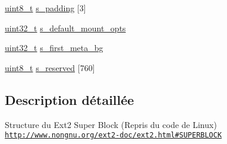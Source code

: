 \begin{DoxyCompactItemize}
\item 
\hyperlink{kernel_2include_2types_8h_aba7bc1797add20fe3efdf37ced1182c5}{uint8\-\_\-t} \hyperlink{structext2__super__block_a81b4e1959f344b5b7445044806d27807}{s\-\_\-padding} \mbox{[}3\mbox{]}
\item 
\hyperlink{kernel_2include_2types_8h_a33594304e786b158f3fb30289278f5af}{uint32\-\_\-t} \hyperlink{structext2__super__block_a8f4946dffa8c6a9027ee9329fd3f94c9}{s\-\_\-default\-\_\-mount\-\_\-opts}
\item 
\hyperlink{kernel_2include_2types_8h_a33594304e786b158f3fb30289278f5af}{uint32\-\_\-t} \hyperlink{structext2__super__block_a436c7c8af548ade7f8045e88c2861d61}{s\-\_\-first\-\_\-meta\-\_\-bg}
\item 
\hyperlink{kernel_2include_2types_8h_aba7bc1797add20fe3efdf37ced1182c5}{uint8\-\_\-t} \hyperlink{structext2__super__block_a17e0d263a7fceb8b53aff24b66c216df}{s\-\_\-reserved} \mbox{[}760\mbox{]}
\end{DoxyCompactItemize}


\subsection{Description détaillée}
Structure du Ext2 Super Block (Repris du code de Linux) \href{http://www.nongnu.org/ext2-doc/ext2.html#SUPERBLOCK}{\tt http\-://www.\-nongnu.\-org/ext2-\/doc/ext2.\-html\#\-S\-U\-P\-E\-R\-B\-L\-O\-C\-K} 

